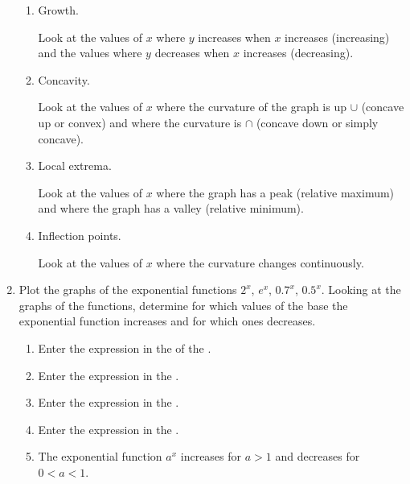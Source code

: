 \begin{enumerate}[leftmargin=*]
\begin{enumerate}
      \item Growth.
            \begin{indication}
            Look at the values of $x$ where $y$ increases when $x$ increases (increasing) and the values where $y$ decreases when $x$ increases (decreasing).
            \end{indication}

      \item Concavity.
            \begin{indication}
            Look at the values of $x$ where the curvature of the graph is up $\cup$ (concave up or convex) and where the curvature is $\cap$ (concave down or simply concave).
            \end{indication}

      \item Local extrema.
            \begin{indication}
            Look at the values of $x$ where the graph has a peak (relative maximum) and where the graph has a valley (relative minimum).
            \end{indication}

      \item Inflection points.
            \begin{indication}
            Look at the values of $x$ where the curvature changes continuously.
            \end{indication}
      \end{enumerate}

\item Plot the graphs of the exponential functions $2^x$, $e^x$, $0.7^x$, $0.5^x$.
      Looking at the graphs of the functions, determine for which values of the base the exponential function increases and for which ones decreases.

      \begin{indication}
      \begin{enumerate}
      \item Enter the expression  in the  of the .
      \item Enter the expression  in the .
      \item Enter the expression  in the .
      \item Enter the expression  in the .
      \item The exponential function $a^x$ increases for $a>1$ and decreases for $0<a<1$.
      \end{enumerate}
      \end{indication}


\end{enumerate}
